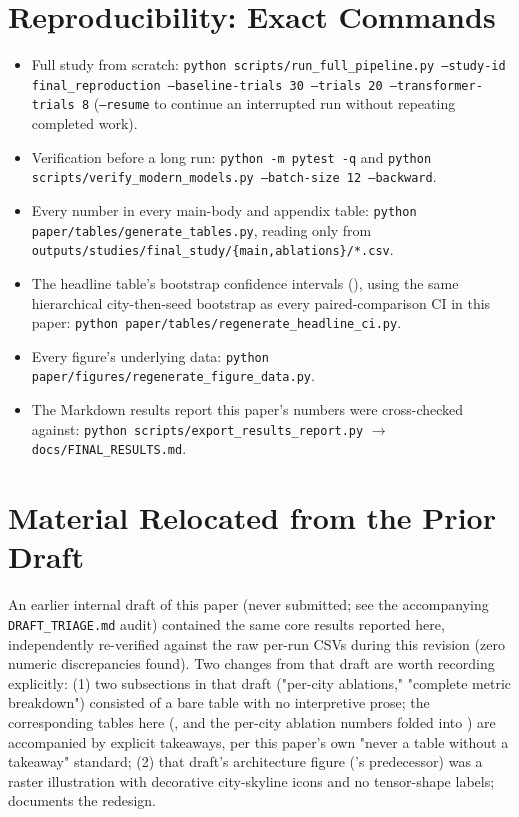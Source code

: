 \section{Reproducibility: Exact Commands}
\label{app:regenerate}

\begin{itemize}
  \item Full study from scratch: \texttt{python scripts/run\_full\_pipeline.py --study-id
        final\_reproduction --baseline-trials 30 --trials 20 --transformer-trials 8}
        (\texttt{--resume} to continue an interrupted run without repeating completed work).
  \item Verification before a long run: \texttt{python -m pytest -q} and
        \texttt{python scripts/verify\_modern\_models.py --batch-size 12 --backward}.
  \item Every number in every main-body and appendix table: \texttt{python
        paper/tables/generate\_tables.py}, reading only from
        \texttt{outputs/studies/final\_study/\{main,ablations\}/*.csv}.
  \item The headline table's bootstrap confidence intervals (), using the same
        hierarchical city-then-seed bootstrap as every paired-comparison CI in this paper:
        \texttt{python paper/tables/regenerate\_headline\_ci.py}.
  \item Every figure's underlying data: \texttt{python
        paper/figures/regenerate\_figure\_data.py}.
  \item The Markdown results report this paper's numbers were cross-checked against:
        \texttt{python scripts/export\_results\_report.py} $\to$ \texttt{docs/FINAL\_RESULTS.md}.
\end{itemize}

\section{Material Relocated from the Prior Draft}
\label{app:relocated}

An earlier internal draft of this paper (never submitted; see the accompanying \texttt{
DRAFT\_TRIAGE.md} audit) contained the same core results reported here, independently re-verified
against the raw per-run CSVs during this revision (zero numeric discrepancies found). Two changes
from that draft are worth recording explicitly: (1) two subsections in that draft
("per-city ablations," "complete metric breakdown") consisted of a bare table with no interpretive
prose; the corresponding tables here (, and the per-city ablation numbers
folded into ) are accompanied by explicit takeaways, per this paper's
own "never a table without a takeaway" standard; (2) that draft's architecture figure
('s predecessor) was a raster illustration with decorative city-skyline
icons and no tensor-shape labels;  documents the redesign.

